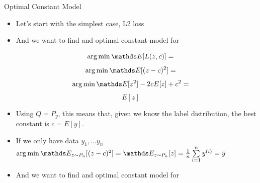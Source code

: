 \documentclass[11pt,compress,t,notes=noshow, xcolor=table]{beamer}
\begin{document}
\begin{vbframe}{Optimal Constant Model}

\begin{itemize}
\item Let's start with the simplest case, L2 loss
\item And we want to find and optimal constant model for 

\end{itemize}

$$ \argmin \E [L(z, c)] = $$
$$ \argmin \E [(z - c)^2] = $$
$$ \argmin \E [z^2] - 2cE[z] + c^2 = $$
$$ E[z] $$

\begin{itemize}
\item Using $Q = P_y$, this means that, given we know the label distribution,
the best constant is $c = E[y]$.
\item If we only have data $y_1, \ldots y_n$
$\argmin \E_{z \sim P_n} [(z - c)^2] = \E_{z \sim P_n}[z] = \frac{1}{n} \sumin \yi = \bar{y}$


\item And we want to find and optimal constant model for 

\end{itemize}


\end{vbframe}
\end{document}
